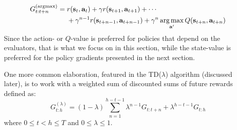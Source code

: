 \documentclass{article}
\DeclareMathOperator*{\argmax}{arg\,max}
\begin{document}
\begin{equation}
\begin{split}
G_{t:t+n}^{(\text{argmax})}&=r(\mathbf{s}_t,\mathbf{a}_t)+\gamma r(\mathbf{s}_{t+1},\mathbf{a}_{t+1})+\cdots\\&\nobreakspace\nobreakspace\nobreakspace\nobreakspace+\gamma^{n-1}r(\mathbf{s}_{t+n-1},\mathbf{a}_{t+n-1})+\gamma^n \argmax_{\mathbf{a}'}Q (\mathbf{s}_{t+n},\mathbf{a}_{t+n})\\\end{split}\end{equation}Since the action- or $Q$-value is preferred for policies that depend on the evaluators, that is what we focus on in this section, while the state-value is preferred for the policy gradients presented in the next section.

One more common elaboration, featured in the TD($\lambda$) algorithm (discussed later), is to work with a weighted sum of discounted sums of future rewards defined as:
\begin{equation}
G_{t:h}^{(\lambda)} =(1-\lambda)\sum_{n=1}^{h-t-1}\lambda^{n-1}G_{t:t+n}+\lambda^{h-t-1}G_{t:h} 
\end{equation} where $0\leq t<h\leq T$ and $0\leq \lambda \leq 1$.
\end{document}
